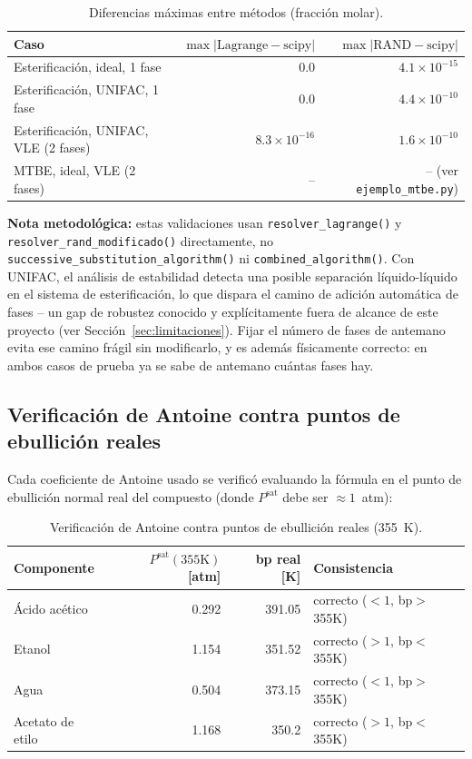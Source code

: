 \documentclass[11pt,a4paper]{article}
\begin{document}
\begin{table}[h]
\centering
\caption{Diferencias máximas entre métodos (fracción molar).}
\begin{tabular}{@{}lrr@{}}
\toprule
Caso & $\max|\text{Lagrange}-\text{scipy}|$ & $\max|\text{RAND}-\text{scipy}|$ \\
\midrule
Esterificación, ideal, 1 fase & $0.0$ & $4.1\times 10^{-15}$ \\
Esterificación, UNIFAC, 1 fase & $0.0$ & $4.4\times 10^{-10}$ \\
Esterificación, UNIFAC, VLE (2 fases) & $8.3\times 10^{-16}$ & $1.6\times 10^{-10}$ \\
MTBE, ideal, VLE (2 fases) & -- & -- (ver \texttt{ejemplo\_mtbe.py}) \\
\bottomrule
\end{tabular}
\end{table}

\textbf{Nota metodológica:} estas validaciones usan
\texttt{resolver\_lagrange()} y \texttt{resolver\_rand\_modificado()}
directamente, no \texttt{successive\_substitution\_algorithm()} ni
\texttt{combined\_algorithm()}. Con UNIFAC, el análisis de estabilidad
detecta una posible separación líquido-líquido en el sistema de
esterificación, lo que dispara el camino de adición automática de
fases -- un gap de robustez conocido y explícitamente fuera de alcance
de este proyecto (ver Sección~\ref{sec:limitaciones}). Fijar el número
de fases de antemano evita ese camino frágil sin modificarlo, y es
además físicamente correcto: en ambos casos de prueba ya se sabe de
antemano cuántas fases hay.

\subsection{Verificación de Antoine contra puntos de ebullición reales}
\label{sec:validacion-antoine}

Cada coeficiente de Antoine usado se verificó evaluando la fórmula en
el punto de ebullición normal real del compuesto (donde $P^{\text{sat}}$
debe ser $\approx 1$~atm):

\begin{table}[h]
\centering
\caption{Verificación de Antoine contra puntos de ebullición reales (355~K).}
\begin{tabular}{@{}lrrl@{}}
\toprule
Componente & $P^{\text{sat}}(355\text{K})$ [atm] & bp real [K] & Consistencia \\
\midrule
Ácido acético & 0.292 & 391.05 & correcto ($<1$, bp$>$355K) \\
Etanol & 1.154 & 351.52 & correcto ($>1$, bp$<$355K) \\
Agua & 0.504 & 373.15 & correcto ($<1$, bp$>$355K) \\
Acetato de etilo & 1.168 & 350.2 & correcto ($>1$, bp$<$355K) \\
\bottomrule
\end{tabular}
\end{table}
\end{document}

